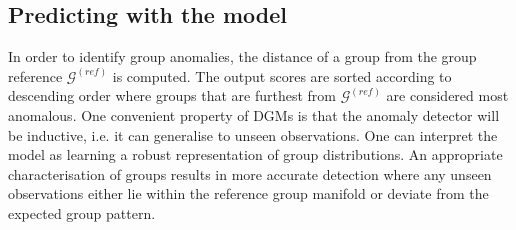 %
\subsection{Predicting with the model}
In order to identify  group anomalies, the distance of a group from  the group reference   $\mathcal{G}^{(ref)}$ is computed. The output scores are sorted according to descending order where groups that are furthest from $\mathcal{G}^{(ref)}$ are considered most anomalous. One convenient property of DGMs is that the anomaly detector will be inductive, i.e.  it can generalise to unseen observations. One can interpret the model as learning a robust representation of  group distributions. An appropriate characterisation of groups results in more accurate detection  where any unseen  observations  either  lie within the reference group manifold or deviate from the expected group pattern. %






